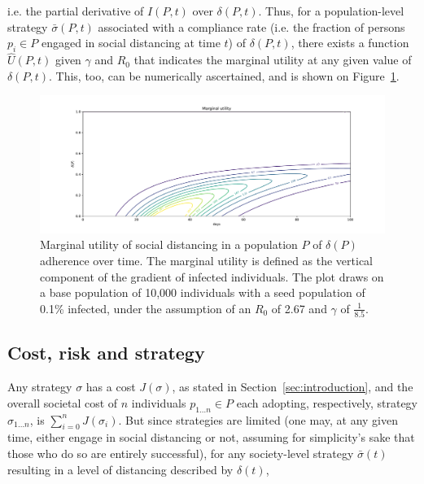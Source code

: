 \documentclass{article}
\begin{document}
\noindent i.e. the partial derivative of $I(P, t)$ over $\delta(P, t)$. Thus, for a population-level strategy $\bar{\sigma}(P, t)$ associated with a compliance rate (i.e. the fraction of persons $p_i \in P$ engaged in social distancing at time $t$) of $\delta(P, t)$, there exists a function $\hat{U}(P, t)$ given $\gamma$ and $R_0$ that indicates the marginal utility at any given value of $\delta(P, t)$. This, too, can be numerically ascertained, and is shown on Figure~\ref{fig:marginal_utility}.

\begin{figure}
	\includegraphics[width=\linewidth]{figures/marginal_utility}
	\caption{Marginal utility of social distancing in a population $P$ of $\delta(P)$ adherence over time. The marginal utility is defined as the vertical component of the gradient of infected individuals. The plot draws on a base population of 10,000 individuals with a seed population of 0.1\% infected, under the assumption of an $R_0$ of 2.67 and $\gamma$ of $\frac{1}{8.5}$.}
	\label{fig:marginal_utility}
\end{figure}


\subsection{Cost, risk and strategy} %
\label{sub:cost_risk_and_strategy}

Any strategy $\sigma$ has a cost $J(\sigma)$, as stated in Section~\ref{sec:introduction}, and the overall societal cost of $n$ individuals $p_{1 \ldots n} \in P$ each adopting, respectively, strategy $\sigma_{1 \ldots n}$, is $\sum_{i=0}^n J(\sigma_i)$. But since strategies are limited (one may, at any given time, either engage in social distancing or not, assuming for simplicity's sake that those who do so are entirely successful), for any society-level strategy $\bar{\sigma} (t)$ resulting in a level of distancing described by $\delta (t)$, 
\end{document}
